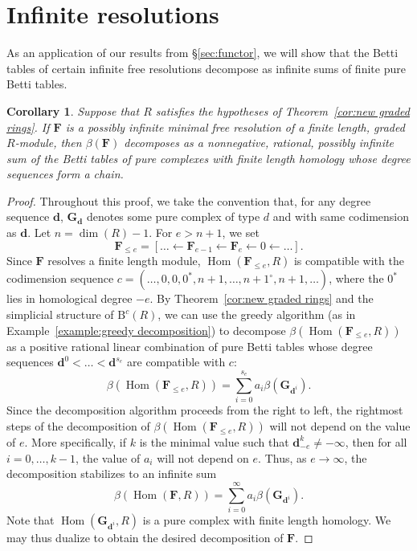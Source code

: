 \documentclass[12pt]{amsart}
\newtheorem{cor}[lemma]{Corollary}
\theoremstyle{definition}
\theoremstyle{remark}
\newcommand{\Hom}{\operatorname{Hom}} %
\newcommand{\cc}{c}
\newcommand{\dd}{\mathbf{d}}
\newcommand{\FF}{\mathbf{F}}
\newcommand{\zp}{\circ}
\newcommand{\BBQ}{\mathrm{B}}
\begin{document}
\section{Infinite resolutions}\label{sec:infinite}
As an application of our results from \S\ref{sec:functor}, we will show that the Betti tables of certain infinite free resolutions decompose as infinite sums of finite pure Betti tables.

\begin{cor}\label{cor:decomp infinite}
Suppose that $R$ satisfies the hypotheses of Theorem~\ref{cor:new graded rings}. If $\FF$ is a possibly infinite minimal free resolution of a finite length, graded $R$-module, then $\beta(\FF)$ decomposes as a nonnegative, rational, possibly infinite sum of the Betti tables of pure complexes with finite length homology whose degree sequences form a chain.
\end{cor}
\begin{proof}
Throughout this proof, we take the convention that, for any degree sequence $\dd$, $\mathbf{G}_{\dd}$ denotes some pure complex of type $d$ and with same codimension as $\dd$.  Let $n=\dim(R)-1$.  For $e> n+1$, we set
\[
\FF_{\leq e}=[\dots \gets \FF_{e-1}\gets \FF_e \gets 0 \gets \dots].
\]
Since $\FF$ resolves a finite length module, $\Hom(\FF_{\leq e},R)$ is compatible with the codimension sequence $\cc=(\dots,0,0,0^*,n+1,\dots, n+1^\zp, n+1,\dots)$, where the $0^*$ lies in homological degree $-e$.  By Theorem~\ref{cor:new graded rings} and the simplicial structure of
$\BBQ^{\cc}(R)$, we can use the greedy algorithm (as in Example~\ref{example:greedy decomposition}) to decompose 
$\beta(\Hom(\FF_{\leq e},R))$ as a positive rational linear combination of pure Betti tables whose degree sequences $\dd^0<\dots <\dd^{s_e}$ are compatible with $\cc$:
\[
\beta(\Hom(\FF_{\leq e},R))=\sum_{i=0}^{s_e} a_{i}\beta(\mathbf{G}_{\dd^i}).
\]
Since the decomposition algorithm proceeds from the right to left, the rightmost steps of the decomposition of $\beta(\Hom(\FF_{\leq e},R))$ will not depend on the value of $e$.  More specifically, if
$k$ is the minimal value such that $\dd^k_{-e}\ne -\infty$, then for all $i=0, \dots, k-1$, the value of $a_i$ will not depend on $e$.   Thus, as $e\to \infty$, the decomposition stabilizes to an infinite sum
\[
\beta(\Hom(\FF,R))=\sum_{i=0}^\infty a_i\beta(\mathbf{G}_{\dd^i}).
\]
Note that $\Hom(\mathbf{G}_{\dd^i},R)$ is a pure complex with finite length homology.  We may thus dualize to obtain the desired decomposition of $\FF$.
\end{proof}
\end{document}
